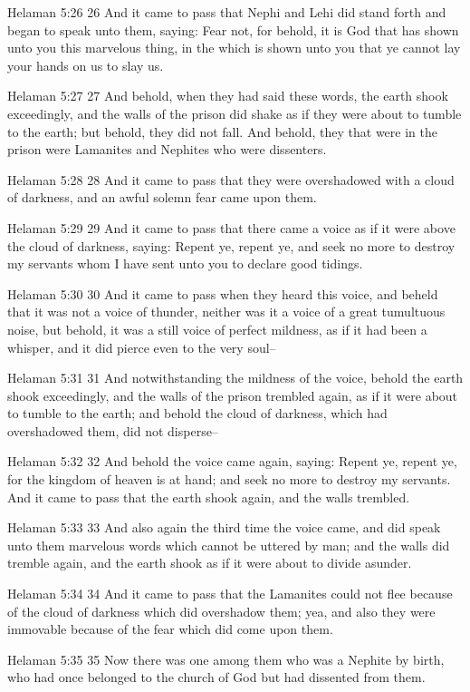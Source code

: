 Helaman 5:26
 26 And it came to pass that Nephi and Lehi did stand forth and
began to speak unto them, saying: Fear not, for behold, it is God
that has shown unto you this marvelous thing, in the which is
shown unto you that ye cannot lay your hands on us to slay us.

Helaman 5:27
 27 And behold, when they had said these words, the earth shook
exceedingly, and the walls of the prison did shake as if they
were about to tumble to the earth; but behold, they did not fall.
And behold, they that were in the prison were Lamanites and
Nephites who were dissenters.

Helaman 5:28
 28 And it came to pass that they were overshadowed with a cloud
of darkness, and an awful solemn fear came upon them.

Helaman 5:29
 29 And it came to pass that there came a voice as if it were
above the cloud of darkness, saying: Repent ye, repent ye, and
seek no more to destroy my servants whom I have sent unto you to
declare good tidings.

Helaman 5:30
 30 And it came to pass when they heard this voice, and beheld
that it was not a voice of thunder, neither was it a voice of a
great tumultuous noise, but behold, it was a still voice of
perfect mildness, as if it had been a whisper, and it did pierce
even to the very soul--

Helaman 5:31
 31 And notwithstanding the mildness of the voice, behold the
earth shook exceedingly, and the walls of the prison trembled
again, as if it were about to tumble to the earth; and behold the
cloud of darkness, which had overshadowed them, did not
disperse--

Helaman 5:32
 32 And behold the voice came again, saying: Repent ye, repent
ye, for the kingdom of heaven is at hand; and seek no more to
destroy my servants. And it came to pass that the earth shook
again, and the walls trembled.

Helaman 5:33
 33 And also again the third time the voice came, and did speak
unto them marvelous words which cannot be uttered by man; and the
walls did tremble again, and the earth shook as if it were about
to divide asunder.

Helaman 5:34
 34 And it came to pass that the Lamanites could not flee because
of the cloud of darkness which did overshadow them; yea, and also
they were immovable because of the fear which did come upon them.

Helaman 5:35
 35 Now there was one among them who was a Nephite by birth, who
had once belonged to the church of God but had dissented from
them.

